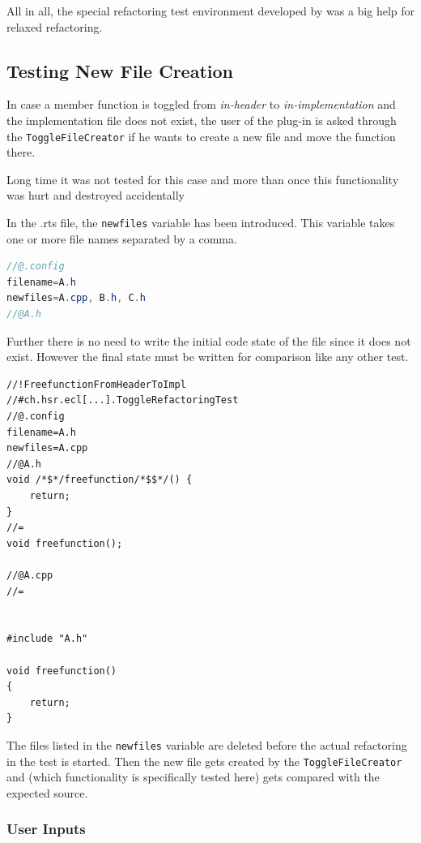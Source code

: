 All in all, the special refactoring test environment developed by \cite{GB06} 
was a big help for relaxed refactoring.

\subsection{Testing New File Creation}

In case a member function is toggled from \textit{in-header} to
\textit{in-implementation} and the implementation file does not exist, the user
of the plug-in is asked through the \texttt{ToggleFileCreator} if he wants to
create a new file and move the function there.

Long time it was not tested for this case and more than once this functionality
was hurt and destroyed accidentally 

In the .rts file, the \texttt{newfiles} variable has been introduced. This
variable takes one or more file names separated by a comma.

\begin{lstlisting}[caption={Syntax to set variables inside a .rts file},
language=java]
//@.config
filename=A.h
newfiles=A.cpp, B.h, C.h
//@A.h
\end{lstlisting}

Further there is no need to write the initial code state of the file since it
does not exist. However the final state must be written for comparison like
any other test.

\begin{lstlisting}[caption={Writing test for newfile creation }]
//!FreefunctionFromHeaderToImpl
//#ch.hsr.ecl[...].ToggleRefactoringTest
//@.config
filename=A.h
newfiles=A.cpp
//@A.h
void /*$*/freefunction/*$$*/() {
    return;
}
//=
void freefunction();

//@A.cpp
//=


#include "A.h"

void freefunction()
{
    return;
}
\end{lstlisting}

The files listed in the \texttt{newfiles} variable are deleted before the
actual refactoring in the test is started. Then the new file gets created by
the \texttt{ToggleFileCreator} and (which functionality is specifically tested
here) gets compared with the expected source.


\subsubsection{User Inputs}


